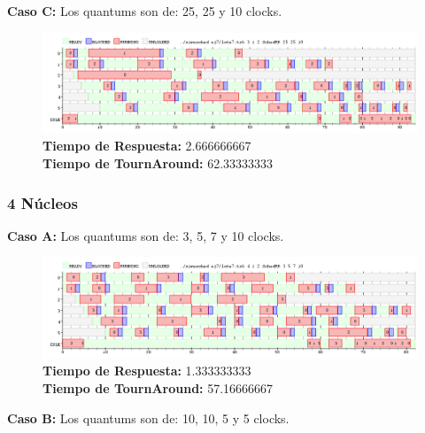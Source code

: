\documentclass[a4paper]{article}
\begin{document}
	\textbf{Caso C:}  Los quantums son de: 25, 25 y 10 clocks.

		 \begin{figure}[h!]
   \begin{center}
 	\includegraphics[scale=0.5]{imagenes/ej7/3nucleoC.png}
 	\textbf{Tiempo de Respuesta:} 2.666666667 \\
 	\textbf{Tiempo de TournAround:} 62.33333333 \\
   \end{center}
 \end{figure} 
 
 \newpage
	\subsubsection*{4 N\'ucleos}
	
	\textbf{Caso A:}  Los quantums son de: 3, 5, 7 y 10 clocks.
	
		 \begin{figure}[h!]
   \begin{center}
 	\includegraphics[scale=0.5]{imagenes/ej7/4nucleoA.png}
 	\textbf{Tiempo de Respuesta:} 1.333333333 \\
 	\textbf{Tiempo de TournAround:} 57.16666667 \\
   \end{center}
 \end{figure} 
 	
	\textbf{Caso B:}  Los quantums son de: 10, 10, 5 y 5 clocks.
	
\end{document}
